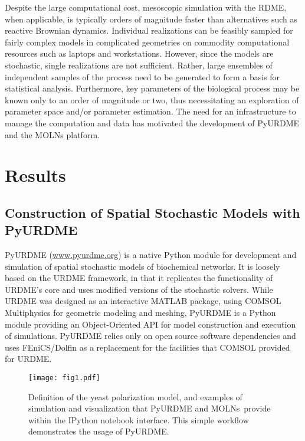 \documentclass[final,leqno,onefignum,onetabnum]{siamltex1213}
\def\packagename {MOLNs}
\begin{document}
Despite the large computational cost, mesoscopic simulation with the RDME, when applicable, is typically orders of magnitude faster than alternatives such as reactive Brownian dynamics.  Individual realizations can be feasibly sampled for fairly complex models in complicated geometries on commodity computational resources such as laptops and workstations. However, since the models are stochastic, single realizations are not sufficient. Rather,  large ensembles of independent samples of the process need to be generated to form a basis for statistical analysis. 
Furthermore, key parameters of the biological process may be known only to an order of magnitude or two, thus necessitating an exploration of parameter space and/or parameter estimation. The need for an infrastructure to manage the computation and data has motivated the development of PyURDME and the MOLNs platform.






\section{Results}
\subsection{Construction of Spatial Stochastic Models with PyURDME}

\label{sec:pyurdme}

PyURDME (\url{www.pyurdme.org}) is a native Python module for development and simulation of spatial stochastic models of biochemical networks. It is loosely based on the URDME \cite{urdme} framework, in that it replicates the functionality of URDME's core and uses modified versions of the stochastic solvers. While URDME was designed as an interactive MATLAB package, using COMSOL Multiphysics for geometric modeling and meshing, PyURDME is a Python module providing an Object-Oriented API for model construction and execution of simulations. PyURDME relies only on open source software dependencies and uses FEniCS/Dolfin \cite{LoggMardalEtAl2012a} as a replacement for the facilities that COMSOL provided for URDME. 

\begin{figure}[htpb]
\begin{center}
\texttt{[image: fig1.pdf]}
\end{center}
\caption{Definition of the yeast polarization model, and examples of simulation and visualization that PyURDME and \packagename~provide within the IPython notebook interface.  This simple workflow demonstrates the usage of PyURDME.
}
\label{fig:fig1}
\end{figure}
\end{document}
